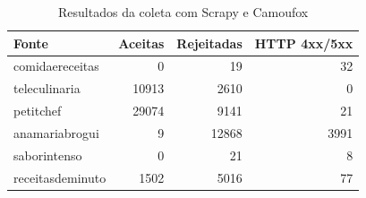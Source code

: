 \begin{table}[ht]
\centering
\caption{Resultados da coleta com Scrapy e Camoufox}
\begin{tabular}{lrrr}
\hline
Fonte & Aceitas & Rejeitadas & HTTP 4xx/5xx \\
\hline
comidaereceitas & 0 & 19 & 32 \\
teleculinaria & 10913 & 2610 & 0 \\
petitchef & 29074 & 9141 & 21 \\
anamariabrogui & 9 & 12868 & 3991 \\
saborintenso & 0 & 21 & 8 \\
receitasdeminuto & 1502 & 5016 & 77 \\
\hline
\end{tabular}
\end{table}